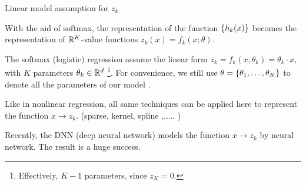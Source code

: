 \documentclass[english,handout]{beamer}
\begin{document}
\frame
{
{Linear model assumption  for $z_k$ }
\biz
\item 
With the aid of softmax, the representation 
of the function $\left\{h_k(x)\right\}$ becomes the representation of 
${\mathbb{R}}^K$-value functions ${z_k(x)}=f_k(x;\theta)$.

\item 
The softmax (logistic) regression assume the linear form 
$
z_k = f_k(x;\theta_k)=\theta_k \cdot x,
$
with $K$ parameters $\theta_k\in {\mathbb{R}}^d$
\footnote{
Effectively, $K-1$ parameters,  since $z_K=0$.}.
For convenience, we still
 use ${  \theta}=\left\{\theta_1,\ldots, \theta_K\right\}$ to denote all the parameters of our model .
\item Like in nonlinear regression,
all same techniques can be applied
here to represent the function $x\to z_k$. 
(sparse, kernel, spline ,..... )
 \item
Recently, the DNN (deep neural network)
models the function $x\to z_k$ by neural network.
The result is a huge success.



 \eiz
 
 }
 
\end{document}
